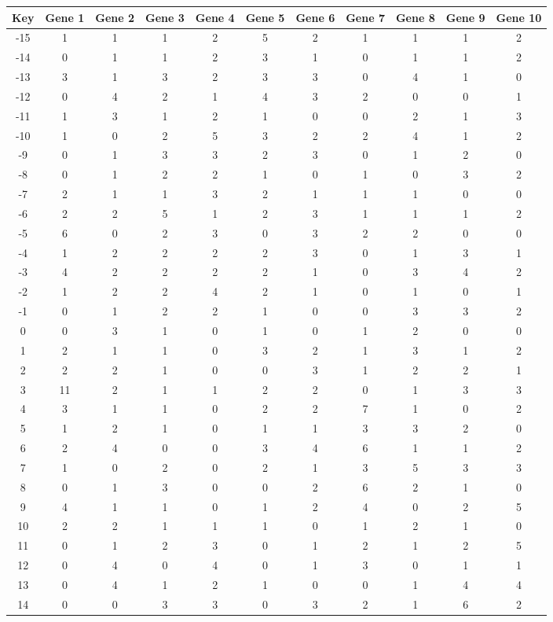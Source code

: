 \begin{tabular}{|c|c|c|c|c|c|c|c|c|c|c|}
\hline
Key & Gene 1 & Gene 2 & Gene 3 & Gene 4 & Gene 5 & Gene 6 & Gene 7 & Gene 8 & Gene 9 & Gene 10 \\
\hline
-15 & 1 & 1 & 1 & 2 & 5 & 2 & 1 & 1 & 1 & 2 \\
-14 & 0 & 1 & 1 & 2 & 3 & 1 & 0 & 1 & 1 & 2 \\
-13 & 3 & 1 & 3 & 2 & 3 & 3 & 0 & 4 & 1 & 0 \\
-12 & 0 & 4 & 2 & 1 & 4 & 3 & 2 & 0 & 0 & 1 \\
-11 & 1 & 3 & 1 & 2 & 1 & 0 & 0 & 2 & 1 & 3 \\
-10 & 1 & 0 & 2 & 5 & 3 & 2 & 2 & 4 & 1 & 2 \\
-9 & 0 & 1 & 3 & 3 & 2 & 3 & 0 & 1 & 2 & 0 \\
-8 & 0 & 1 & 2 & 2 & 1 & 0 & 1 & 0 & 3 & 2 \\
-7 & 2 & 1 & 1 & 3 & 2 & 1 & 1 & 1 & 0 & 0 \\
-6 & 2 & 2 & 5 & 1 & 2 & 3 & 1 & 1 & 1 & 2 \\
-5 & 6 & 0 & 2 & 3 & 0 & 3 & 2 & 2 & 0 & 0 \\
-4 & 1 & 2 & 2 & 2 & 2 & 3 & 0 & 1 & 3 & 1 \\
-3 & 4 & 2 & 2 & 2 & 2 & 1 & 0 & 3 & 4 & 2 \\
-2 & 1 & 2 & 2 & 4 & 2 & 1 & 0 & 1 & 0 & 1 \\
-1 & 0 & 1 & 2 & 2 & 1 & 0 & 0 & 3 & 3 & 2 \\
0 & 0 & 3 & 1 & 0 & 1 & 0 & 1 & 2 & 0 & 0 \\
1 & 2 & 1 & 1 & 0 & 3 & 2 & 1 & 3 & 1 & 2 \\
2 & 2 & 2 & 1 & 0 & 0 & 3 & 1 & 2 & 2 & 1 \\
3 & 11 & 2 & 1 & 1 & 2 & 2 & 0 & 1 & 3 & 3 \\
4 & 3 & 1 & 1 & 0 & 2 & 2 & 7 & 1 & 0 & 2 \\
5 & 1 & 2 & 1 & 0 & 1 & 1 & 3 & 3 & 2 & 0 \\
6 & 2 & 4 & 0 & 0 & 3 & 4 & 6 & 1 & 1 & 2 \\
7 & 1 & 0 & 2 & 0 & 2 & 1 & 3 & 5 & 3 & 3 \\
8 & 0 & 1 & 3 & 0 & 0 & 2 & 6 & 2 & 1 & 0 \\
9 & 4 & 1 & 1 & 0 & 1 & 2 & 4 & 0 & 2 & 5 \\
10 & 2 & 2 & 1 & 1 & 1 & 0 & 1 & 2 & 1 & 0 \\
11 & 0 & 1 & 2 & 3 & 0 & 1 & 2 & 1 & 2 & 5 \\
12 & 0 & 4 & 0 & 4 & 0 & 1 & 3 & 0 & 1 & 1 \\
13 & 0 & 4 & 1 & 2 & 1 & 0 & 0 & 1 & 4 & 4 \\
14 & 0 & 0 & 3 & 3 & 0 & 3 & 2 & 1 & 6 & 2 \\
\hline
\end{tabular}
